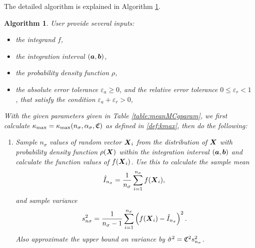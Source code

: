 \documentclass{iitthesis}
\newtheorem{algorithm}[theorem]{Algorithm}
\theoremstyle{definition}
\begin{document}
The detailed algorithm is explained in Algorithm \ref{alg:cubMCg}.
\begin{algorithm}\label{alg:cubMCg} 
User provide several inputs:
\begin{itemize}
\item the integrand $f$,
\item the integration interval $(\boldsymbol{a}, \boldsymbol{b})$,
\item the probability density function $\rho$,
\item the absolute error tolerance $\varepsilon_a \geq 0$, and the relative error tolerance $0 \leq \varepsilon_r <1$, that satisfy the condition $\varepsilon_a+\varepsilon_r >0$,
\end{itemize} 
With the given parameters given in Table \ref{table:meanMCgparam}, we first calculate $\kappa_{\max}=\kappa_{\max}(n_\sigma,\alpha_\sigma,\mathfrak{C})$ as defined in \eqref{def:kmax}, then do the following:
\begin{enumerate}
\item Sample $n_\sigma$ values of random vector $\boldsymbol{X}_i$ from the distribution of $\boldsymbol{X}$ with probability density function $\rho(\boldsymbol{X})$ within the integration interval $(\boldsymbol{a}, \boldsymbol{b})$ and calculate the function values of $f(\boldsymbol{X}_i)$. Use this to calculate the sample mean $$\hat{I}_{n_\sigma} = \frac{1}{n_\sigma}\sum_{i=1}^{n_\sigma} f(\boldsymbol{X}_i),$$ and sample variance $$s_{n\sigma}^2 = \frac{1}{n_\sigma-1}\sum_{i=1}^{n_\sigma} \left(f(\boldsymbol{X}_i)-\hat{I}_{n_\sigma}\right)^2.$$ Also approximate the upper bound on variance by $\hat{\sigma}^2 = \mathfrak{C}^2 s^2_{n_\sigma}$. 


\end{enumerate}
\end{algorithm}
\end{document}
